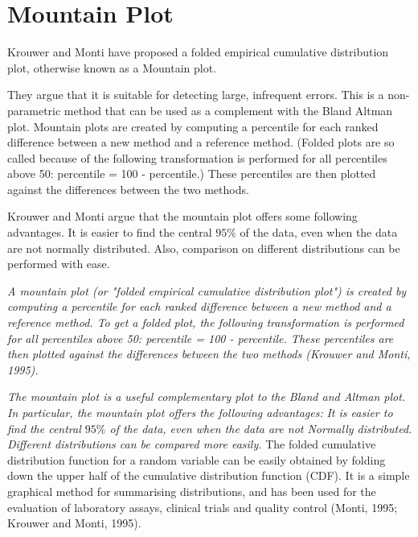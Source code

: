 \documentclass[Chap2bmain.tex]{subfiles}
\begin{document}
\newpage
\section{Mountain Plot} Krouwer and Monti have proposed a folded empirical cumulative distribution plot, otherwise known as a Mountain plot.

They argue that it is suitable for detecting large, infrequent errors. This is a non-parametric method that can be used as a complement with the Bland Altman plot.  Mountain plots are created by computing a percentile
for each ranked difference between a new method and a reference method. (Folded plots are so called because of the following transformation is performed for all percentiles above 50: percentile = 100 - percentile.) These percentiles are then plotted against the differences between the two methods.

Krouwer and Monti argue that the mountain plot offers some following advantages. It is easier to find the central $95\%$ of the data, even when the data are not normally distributed. Also, comparison on different distributions can be performed with ease.

\emph{
A mountain plot (or "folded empirical cumulative distribution plot") is created by computing a percentile for each ranked difference between a new method and a reference method. To get a folded plot, the following transformation is performed for all percentiles above 50: percentile = 100 - percentile. These percentiles are then plotted against the differences between the two methods (Krouwer and Monti, 1995).}

\emph{
The mountain plot is a useful complementary plot to the Bland and Altman plot. In particular, the mountain plot offers the following advantages:}
\emph{
It is easier to find the central $95\%$ of the data, even when the data are not Normally distributed.
Different distributions can be compared more easily.
}
\newpage
The folded cumulative distribution function for a random variable can be easily obtained by folding down the upper half of the cumulative distribution
function (CDF). It is a simple graphical method for summarising distributions, and has been used for the evaluation of laboratory assays, clinical trials
and quality control (Monti, 1995; Krouwer and Monti, 1995).
\end{document}
